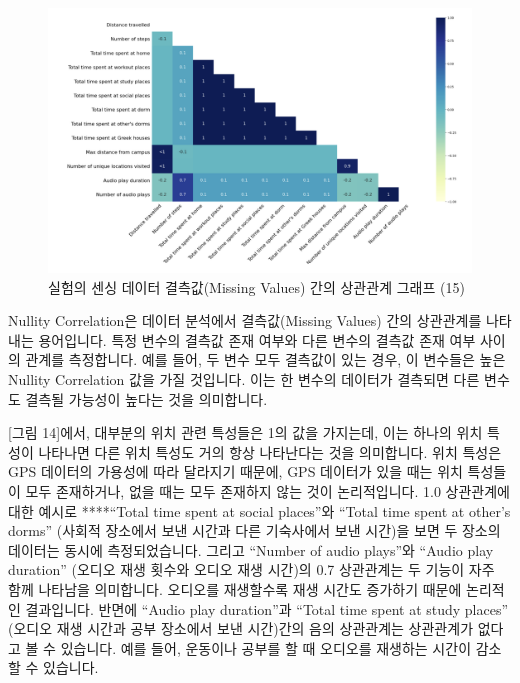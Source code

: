 \documentclass[
  letterpaper,
]{book}
\begin{document}
\begin{figure}[H]

{\centering \includegraphics{img/fig13.png}

}

\caption{실험의 센싱 데이터 결측값(Missing Values) 간의 상관관계 그래프
(15)}

\end{figure}%

Nullity Correlation은 데이터 분석에서 결측값(Missing Values) 간의
상관관계를 나타내는 용어입니다. 특정 변수의 결측값 존재 여부와 다른
변수의 결측값 존재 여부 사이의 관계를 측정합니다. 예를 들어, 두 변수
모두 결측값이 있는 경우, 이 변수들은 높은 Nullity Correlation 값을 가질
것입니다. 이는 한 변수의 데이터가 결측되면 다른 변수도 결측될 가능성이
높다는 것을 의미합니다.

{[}그림 14{]}에서, 대부분의 위치 관련 특성들은 1의 값을 가지는데, 이는
하나의 위치 특성이 나타나면 다른 위치 특성도 거의 항상 나타난다는 것을
의미합니다. 위치 특성은 GPS 데이터의 가용성에 따라 달라지기 때문에, GPS
데이터가 있을 때는 위치 특성들이 모두 존재하거나, 없을 때는 모두
존재하지 않는 것이 논리적입니다. 1.0 상관관계에 대한 예시로 ****``Total
time spent at social places''와 ``Total time spent at other's dorms''
(사회적 장소에서 보낸 시간과 다른 기숙사에서 보낸 시간)을 보면 두 장소의
데이터는 동시에 측정되었습니다. 그리고 ``Number of audio plays''와
``Audio play duration'' (오디오 재생 횟수와 오디오 재생 시간)의 0.7
상관관계는 두 기능이 자주 함께 나타남을 의미합니다. 오디오를 재생할수록
재생 시간도 증가하기 때문에 논리적인 결과입니다. 반면에 ``Audio play
duration''과 ``Total time spent at study places'' (오디오 재생 시간과
공부 장소에서 보낸 시간)간의 음의 상관관계는 상관관계가 없다고 볼 수
있습니다. 예를 들어, 운동이나 공부를 할 때 오디오를 재생하는 시간이
감소할 수 있습니다.
\end{document}
